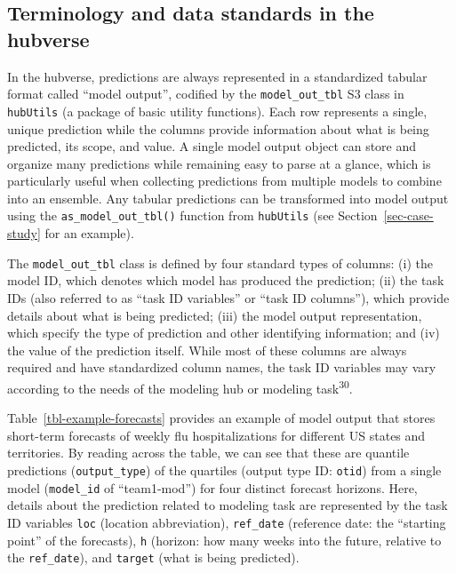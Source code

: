 \documentclass[
  letterpaper,
  DIV=11,
  numbers=noendperiod]{scrartcl}
\begin{document}
\subsection{Terminology and data standards in the
hubverse}\label{terminology-and-data-standards-in-the-hubverse}

In the hubverse, predictions are always represented in a standardized
tabular format called ``model output'', codified by the
\texttt{model\_out\_tbl} S3 class in \texttt{hubUtils} (a package of
basic utility functions). Each row represents a single, unique
prediction while the columns provide information about what is being
predicted, its scope, and value. A single model output object can store
and organize many predictions while remaining easy to parse at a glance,
which is particularly useful when collecting predictions from multiple
models to combine into an ensemble. Any tabular predictions can be
transformed into model output using the \texttt{as\_model\_out\_tbl()}
function from \texttt{hubUtils} (see Section~\ref{sec-case-study} for an
example).

The \texttt{model\_out\_tbl} class is defined by four standard types of
columns: (i) the model ID, which denotes which model has produced the
prediction; (ii) the task IDs (also referred to as ``task ID variables''
or ``task ID columns''), which provide details about what is being
predicted; (iii) the model output representation, which specify the type
of prediction and other identifying information; and (iv) the value of
the prediction itself. While most of these columns are always required
and have standardized column names, the task ID variables may vary
according to the needs of the modeling hub or modeling
task\textsuperscript{30}.

Table~\ref{tbl-example-forecasts} provides an example of model output
that stores short-term forecasts of weekly flu hospitalizations for
different US states and territories. By reading across the table, we can
see that these are quantile predictions (\texttt{output\_type}) of the
quartiles (output type ID: \texttt{otid}) from a single model
(\texttt{model\_id} of ``team1-mod'') for four distinct forecast
horizons. Here, details about the prediction related to modeling task
are represented by the task ID variables \texttt{loc} (location
abbreviation), \texttt{ref\_date} (reference date: the ``starting
point'' of the forecasts), \texttt{h} (horizon: how many weeks into the
future, relative to the \texttt{ref\_date}), and \texttt{target} (what
is being predicted).
\end{document}
